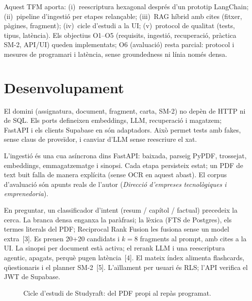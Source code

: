 \documentclass[10pt,a4paper,twoside]{article}
\begin{document}
Aquest TFM aporta: (i)~reescriptura hexagonal després d'un prototip LangChain; (ii)~pipeline d'ingestió per etapes relançable; (iii)~RAG híbrid amb cites (fitxer, pàgines, fragment); (iv)~cicle d'estudi a la UI; (v)~protocol de qualitat (tests, tipus, latència).
Els objectius O1--O5 (requisits, ingestió, recuperació, pràctica SM-2, API/UI) queden implementats; O6 (avaluació) resta parcial: protocol i mesures de programari i latència, sense groundedness ni línia només densa.

\section{Desenvolupament}
El domini (assignatura, document, fragment, carta, SM-2) no depèn de HTTP ni de SQL.
Els ports defineixen embeddings, LLM, recuperació i magatzem; FastAPI i els clients Supabase en són adaptadors.
Això permet tests amb fakes, sense claus de proveïdor, i canviar d'LLM sense reescriure el xat.

L'ingestió és una cua asíncrona dins FastAPI: baixada, parseig PyPDF, trossejat, embeddings, emmagatzematge i sinopsi.
Cada etapa persisteix estat; un PDF de text buit falla de manera explícita (sense OCR en aquest abast).
El corpus d'avaluació són apunts reals de l'autor (\emph{Direcció d'empreses tecnològiques i emprenedoria}).

En preguntar, un classificador d'intent (resum / capítol / factual) precedeix la cerca.
La branca densa enganxa la paràfrasi; la lèxica (FTS de Postgres), els termes literals del PDF; Reciprocal Rank Fusion les fusiona sense un model extra~[3].
Es prenen 20+20 candidats i $k=8$ fragments al prompt, amb cites a la UI.
La sinopsi per document està activa; el rerank LLM i una reescriptura agentic, apagats, perquè pugen latència~[4].
El mateix índex alimenta flashcards, qüestionaris i el planner SM-2~[5].
L'aïllament per usuari és RLS; l'API verifica el JWT de Supabase.

\begin{figure}[H]
\centering
{}
\caption{Cicle d'estudi de Studyraft: del PDF propi al repàs programat.}
\end{figure}
\end{document}
